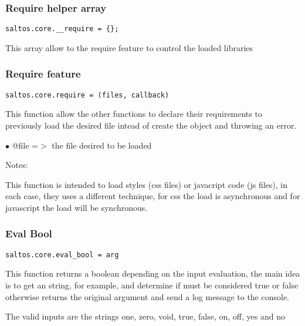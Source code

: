 \documentclass[a4paper]{article}
\begin{document}
\hypertarget{toc707}{}
\subsubsection{Require helper array}

\begin{lstlisting}
saltos.core.__require = {};
\end{lstlisting}

This array allow to the require feature to control the loaded libraries

\hypertarget{toc708}{}
\subsubsection{Require feature}

\begin{lstlisting}
saltos.core.require = (files, callback)
\end{lstlisting}

This function allow the other functions to declare their requirements to previously load the
desired file intead of create the object and throwing an error.

\begin{compactitem}
\item[\color{myblue}$\bullet$] @file =$>$ the file desired to be loaded
\end{compactitem}

Notes:

This function is intended to load styles (css files) or javacript code (js files), in each
case, they uses a different technique, for css the load is asynchronous and for javascript
the load will be synchronous.

\hypertarget{toc709}{}
\subsubsection{Eval Bool}

\begin{lstlisting}
saltos.core.eval_bool = arg
\end{lstlisting}

This function returns a boolean depending on the input evaluation, the main idea
is to get an string, for example, and determine if must be considered true or false
otherwise returns the original argument and send a log message to the console.

The valid inputs are the strings one, zero, void, true, false, on, off, yes and no
\end{document}
